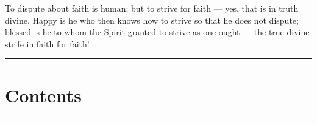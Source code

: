 \documentclass[12pt,a4paper]{book}
\begin{document}
To dispute about faith is human; but to strive for faith --- yes, that is in truth divine. Happy is he who
then knows how to strive so that he does not dispute; blessed is he to whom the Spirit granted to strive
as one ought --- the true divine strife in faith for faith!

\endgroup

\begin{center}
\rule{0.22\textwidth}{0.4pt}
\end{center}

\backmatter
\chapter*{Contents}

\begin{center}
\rule{0.12\textwidth}{0.4pt}
\end{center}

\newcommand{\indpost}[2]{%
  \par\medskip
  \begin{center}\bfseries #1\end{center}
  \par\nobreak\noindent #2\par}
\end{document}
